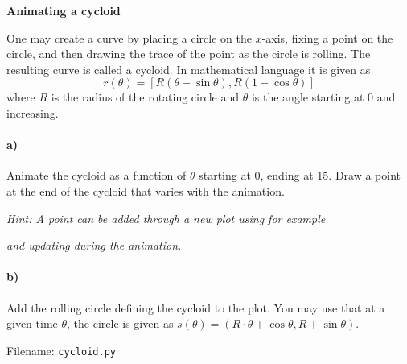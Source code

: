 \begin{Problem}{\textbf{Animating a cycloid}}

\noindent One may create a curve by placing a circle on the $x$-axis, fixing a point on the circle,
and then drawing the trace of the point as the circle is rolling. The resulting
curve is called a cycloid. In mathematical language it is given as
\begin{equation*}
    r(\theta) =[R(\theta-\sin\theta), R(1-\cos \theta)]
\end{equation*}
where $R$ is the radius of the rotating circle and $\theta$ is the angle starting
at 0 and increasing.

\paragraph{a)}
Animate the cycloid as a function of $\theta$ starting at 0, ending at 15. Draw
a point at the end of the cycloid that varies with the animation.

\emph{Hint: A point can be added through a new plot using for example} 
\newline
{}

\emph{and updating during the animation.}

\paragraph{b)}
Add the rolling circle defining the cycloid to the plot. You may use that at a given
time $\theta$, the circle is given as $s(\theta)=(R\cdot\theta + \cos\theta, R + \sin\theta)$.

Filename: \texttt{cycloid.py}
\end{Problem}

